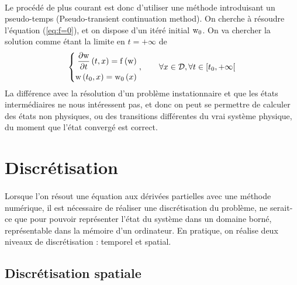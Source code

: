 		\paragraph{}
		Le procédé de plus courant est donc d'utiliser une méthode introduisant un pseudo-temps (Pseudo-transient continuation method).
		On cherche à résoudre l'équation (\ref{eq:f=0}), et on dispose d'un itéré initial $\textup{w}_0$.
		On va chercher la solution comme étant la limite en $t = +\infty$ de
		\begin{equation}\label{eq:edp}
			\left\{\begin{aligned}
				\frac{\partial\textup{w}}{\partial t}\left(t, x\right) = \operatorname{f}\left(\textup{w}\right) \\
				\textup{w}\left(t_0, x\right) = \textup{w}_0\left(x\right)
			\end{aligned}\right.,\qquad \forall x\in\mathcal{D}, \forall t\in\left[t_0, +\infty\right[
		\end{equation}
		La différence avec la résolution d'un problème instationnaire et que les états intermédiaires ne nous intéressent pas, et donc on peut se permettre de calculer des états non physiques, ou des transitions différentes du vrai système physique, du moment que l'état convergé est correct.


\section{Discrétisation}

	\paragraph{}
	Lorsque l'on résout une équation aux dérivées partielles avec une méthode numérique, il est nécessaire de réaliser une discrétisation du problème, ne serait-ce que pour pouvoir représenter l'état du système dans un domaine borné, représentable dans la mémoire d'un ordinateur.
	En pratique, on réalise deux niveaux de discrétisation : temporel et spatial.


	\subsection{Discrétisation spatiale}

